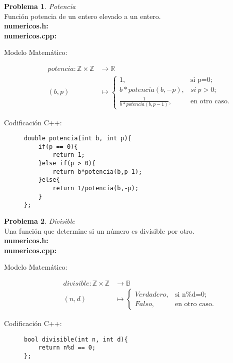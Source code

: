 \documentclass{article}
\theoremstyle{plain}
\theoremstyle{definition}
\newtheorem{problem}{Problema}
\begin{document}
\begin{problem} \emph{Potencia}\\
Función potencia de un entero elevado a un entero.\\
\textbf{numericos.h:}\ \\
\textbf{numericos.cpp:}\ 
\begin{description}
\item[Modelo Matemático:]
%
\begin{align*}
potencia: \mathbb{Z}\times\mathbb{Z} &\to \mathbb{R}\\
(b,p) &\mapsto 
\begin{cases}
1,& \text{si p=0;}\\
b*potencia(b,-p),& si\ p>0;\\
\frac{1}{b*potencia(b,p-1)},& \text{en otro caso.} 
\end{cases}
\end{align*}
%
\item[Codificación \textsf{C++}:]\hfill
%
\begin{verbatim}
double potencia(int b, int p){
    if(p == 0){
        return 1;
    }else if(p > 0){
        return b*potencia(b,p-1);
    }else{
        return 1/potencia(b,-p);
    }
};
\end{verbatim}
\end{description}
\end{problem}

\begin{problem} \emph{Divisible}\\
Una función que determine si un número es divisible por otro.\\
\textbf{numericos.h:}\ \\
\textbf{numericos.cpp:}\ 
%
\begin{description}
\item[Modelo Matemático:]\hfill

\begin{align*}
divisible: \mathbb{Z}\times\mathbb{Z} &\to \mathbb{B}\\
(n,d) &\mapsto 
\begin{cases}
Verdadero,& \text{si n\%d=0;}\\
Falso,& \text{en otro caso.}
\end{cases}
\end{align*}

%
\item[Codificación \textsf{C++}:]\hfill
%
\begin{verbatim}
bool divisible(int n, int d){
    return n%d == 0;
};
\end{verbatim}
\end{description}
\end{problem}
\end{document}
